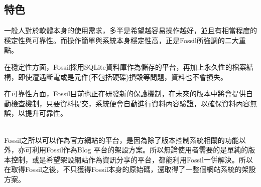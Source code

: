 \renewcommand{\baselinestretch}{20} %
\subsection{特色}
\par
\renewcommand{\baselinestretch}{1} %
\twelve \qquad 一般人對於軟體本身的使用需求，多半是希望越容易操作越好，並且有相當程度的穩定性與可靠性。而操作簡單與系統本身穩定性高，正是Fossil所強調的二大重點。
\\
\par
\renewcommand{\baselinestretch}{1} %
\twelve \hspace{0.5em} 在穩定性方面，Fossil採用SQLite資料庫作為儲存的平台，再加上永久性的檔案結構，即使遭遇斷電或是元件(不包括硬碟)損毀等問題，資料也不會損失。
\\
\par
\renewcommand{\baselinestretch}{1} %
\twelve \hspace{0.5em} 在可靠性方面，Fossil目前也正在研發新的保護機制，在未來的版本中將會提供自動檢查機制，只要資料提交，系統便會自動進行資料內容驗證，以確保資料內容無誤，以提升可靠性。
\\
\par
\\
\renewcommand{\baselinestretch}{1} %
\twelve \hspace{0.5em} Fossil之所以可以作為官方網站的平台，是因為除了版本控制系統相關的功能以外，亦可利用Fossil作為Blog 平台的架設方案。所以無論使用者需要的是單純的版本控制，或是希望架設網站作為資訊分享的平台，都能利用Fossil一併解決。所以在取得Fossil之後，不只獲得Fossil本身的原始碼，還取得了一整個網站系統的架設方案。
\par
\\

\renewcommand{\baselinestretch}{20} %

